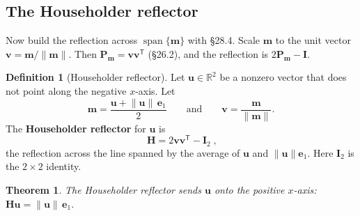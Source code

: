 \documentclass[11pt]{article}
\theoremstyle{plain}
\newtheorem{thm}{Theorem}[section]
\theoremstyle{definition}
\newtheorem{defn}{Definition}[section]
\theoremstyle{remark}
\newcommand{\R}{\mathbb{R}}
\newcommand{\vc}[1]{\mathbf{#1}}
\newcommand{\mt}[1]{\mathbf{#1}}
\newcommand{\norm}[1]{\lVert #1\rVert}
\newcommand{\T}{^{\mathsf{T}}}
\DeclareMathOperator{\spanop}{span}
\begin{document}
\begin{center}
\end{center}

\subsection{The Householder reflector}
Now build the reflection across $\spanop\{\vc{m}\}$ with \S28.4. Scale $\vc{m}$
to the unit vector $\vc{v}=\vc{m}/\norm{\vc{m}}$. Then
$\mt{P}_{\vc{m}}=\vc{v}\vc{v}\T$ (\S26.2), and the reflection is
$2\mt{P}_{\vc{m}}-\mt{I}$.

\begin{defn}[Householder reflector]
Let $\vc{u}\in\R^{2}$ be a nonzero vector that does not point along the negative
$x$-axis. Let
\[
  \vc{m}=\frac{\vc{u}+\norm{\vc{u}}\,\vc{e}_1}{2}
  \qquad\text{and}\qquad
  \vc{v}=\frac{\vc{m}}{\norm{\vc{m}}} .
\]
The \textbf{Householder reflector} for $\vc{u}$ is
\[
  \boxed{\;\mt{H}=2\vc{v}\vc{v}\T-\mt{I}_{2}\;},
\]
the reflection across the line spanned by the average of $\vc{u}$ and
$\norm{\vc{u}}\vc{e}_1$. Here $\mt{I}_{2}$ is the $2\times2$ identity.
\end{defn}

\begin{thm}
\label{thm:householder}
The Householder reflector sends $\vc{u}$ onto the positive $x$-axis:
$\mt{H}\vc{u}=\norm{\vc{u}}\,\vc{e}_1$.
\end{thm}
\end{document}

